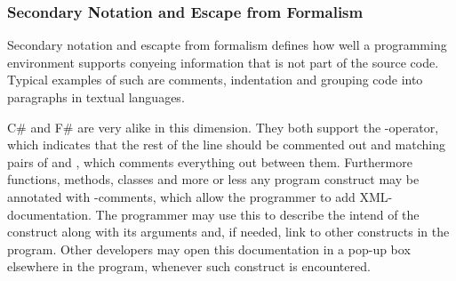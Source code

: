 \subsubsection{Secondary Notation and Escape from Formalism}
Secondary notation and escapte from formalism defines how well a programming environment supports conyeing information that is not part of the source code. Typical examples of such are comments, indentation and grouping code into paragraphs in textual languages\cite{green1996usability}.

C\# and F\# are very alike in this dimension. They both support the \ttt{//}-operator, which indicates that the rest of the line should be commented out and matching pairs of \ttt{/*} and \ttt{*/}, which comments everything out between them. Furthermore functions, methods, classes and more or less any program construct may be annotated with \ttt{///}-comments, which allow the programmer to add \gls{XML}-documentation\cite{fsharp:xml:doc}. The programmer may use this to describe the intend of the construct along with its arguments and, if needed, link to other constructs in the program. Other developers may open this documentation in a pop-up box elsewhere in the program, whenever such construct is encountered.
